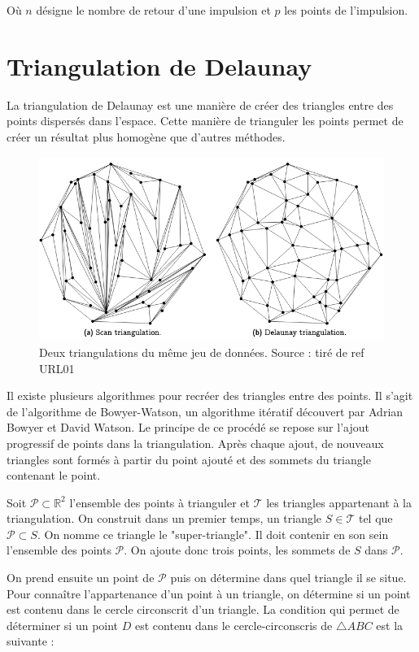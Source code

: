 Où $n$ désigne le nombre de retour d'une impulsion et $p$ les points de l'impulsion.


\section{Triangulation de Delaunay}
La triangulation de Delaunay est une manière de créer des triangles entre des points dispersés dans l’espace.
Cette manière de trianguler les points permet de créer un résultat plus homogène que d’autres méthodes.

\begin{figure}[htb!]
    \centering
    \includegraphics[width=0.8\linewidth]{figures/triangulation-example.png}
    \caption{Deux triangulations du même jeu de données. Source : tiré de ref URL01}
    \label{fig:triangulation_example}
\end{figure}

Il existe plusieurs algorithmes pour recréer des triangles entre des points.
Il s’agit de l’algorithme de Bowyer-Watson, un algorithme itératif découvert par Adrian Bowyer et David Watson.
Le principe de ce procédé se repose sur l’ajout progressif de points dans la triangulation.
Après chaque ajout, de nouveaux triangles sont formés à partir du point ajouté et des sommets du triangle contenant le point.

Soit $\mathcal{P} \subset \mathbb{R}^2$ l'ensemble des points à trianguler et $\mathcal{T}$ les triangles appartenant à la triangulation. On construit dans un premier temps, un triangle $S \in \mathcal{T}$ tel que $\mathcal{P} \subset S$. On nomme ce triangle le "super-triangle". Il doit contenir en son sein l'ensemble des points $\mathcal{P}$. On ajoute donc trois points, les sommets de $S$ dans $\mathcal{P}$.

On prend ensuite un point de $\mathcal{P}$ puis on détermine dans quel triangle il se situe.
Pour connaître l'appartenance d'un point à un triangle, on détermine si un point est contenu dans le cercle circonscrit d'un triangle.
La condition qui permet de déterminer si un point $D$ est contenu dans le cercle-circonscris de $\triangle ABC$ est la suivante :

